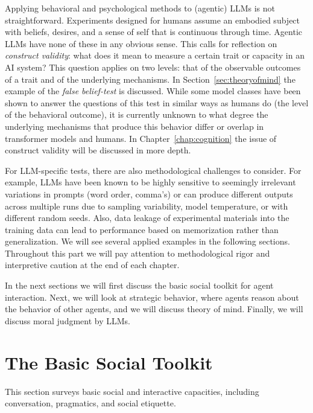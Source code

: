 Applying behavioral and psychological methods to (agentic) LLMs is not straightforward. Experiments designed for humans assume an embodied subject with beliefs, desires, and a sense of self that is continuous through time. Agentic LLMs have none of these in any obvious sense. This calls for  reflection on \emph{construct validity}: what does it mean to measure a certain trait or capacity in an AI system? This question applies on two levels: that of the observable outcomes of a trait and of the underlying mechanisms. In Section~\ref{sec:theoryofmind}  the example of the {\em false belief-test} \citep{carpenter2002new} is discussed. While some model classes have been shown to answer the questions of this test in similar ways as humans do (the level of the behavioral outcome), it is currently unknown to what degree the underlying mechanisms that produce this behavior differ or overlap in transformer models and humans. In Chapter~\ref{chap:cognition} the issue of construct validity will be discussed in more depth. %

For LLM-specific tests, there are also methodological challenges to consider. For example, LLMs have been known to be highly sensitive to seemingly irrelevant variations in prompts (word order, comma's) or can produce different outputs across multiple runs due to sampling variability, model temperature, or with different random seeds. Also, data leakage of experimental materials into the training data can lead to performance based on memorization rather than  generalization. We will see several applied examples in the following sections. Throughout this part we will pay attention to methodological rigor and interpretive caution at the end of each chapter. 

In the next sections we will first discuss the basic social toolkit for agent interaction. Next, we will look at strategic behavior, where agents reason about the behavior of other agents, and we will discuss theory of mind. Finally, we will discuss moral judgment by LLMs.

\section{The Basic Social Toolkit}
This section surveys  basic social and interactive capacities, including conversation, pragmatics, and social etiquette.

